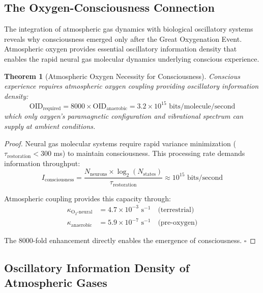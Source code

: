 \documentclass[12pt]{article}
\newtheorem{theorem}{Theorem}[section]
\theoremstyle{remark}
\begin{document}
\subsection{The Oxygen-Consciousness Connection}

The integration of atmospheric gas dynamics with biological oscillatory systems reveals why consciousness emerged only after the Great Oxygenation Event. Atmospheric oxygen provides essential oscillatory information density that enables the rapid neural gas molecular dynamics underlying conscious experience.

\begin{theorem}[Atmospheric Oxygen Necessity for Consciousness]
Conscious experience requires atmospheric oxygen coupling providing oscillatory information density:
\begin{equation}
\text{OID}_{\text{required}} = 8000 \times \text{OID}_{\text{anaerobic}} = 3.2 \times 10^{15} \text{ bits/molecule/second}
\end{equation}
which only oxygen's paramagnetic configuration and vibrational spectrum can supply at ambient conditions.
\end{theorem}

\begin{proof}
Neural gas molecular systems require rapid variance minimization ($\tau_{\text{restoration}} < 300$ ms) to maintain consciousness. This processing rate demands information throughput:
\begin{equation}
I_{\text{consciousness}} = \frac{N_{\text{neurons}} \times \log_2(N_{\text{states}})}{\tau_{\text{restoration}}} \approx 10^{15} \text{ bits/second}
\end{equation}

Atmospheric coupling provides this capacity through:
\begin{align}
\kappa_{\text{O}_2\text{-neural}} &= 4.7 \times 10^{-3} \text{ s}^{-1} \quad \text{(terrestrial)} \\
\kappa_{\text{anaerobic}} &= 5.9 \times 10^{-7} \text{ s}^{-1} \quad \text{(pre-oxygen)}
\end{align}

The 8000-fold enhancement directly enables the emergence of consciousness. $\square$
\end{proof}

\subsection{Oscillatory Information Density of Atmospheric Gases}
\end{document}
